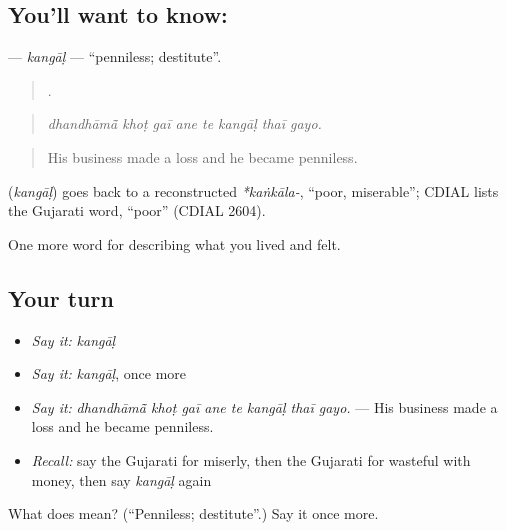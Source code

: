 \subsection*{You'll want to know: }
\textbf{} — \emph{kangāḷ} — \textquotedblleft{}penniless; destitute\textquotedblright{}.

\begin{quote}
       .
\end{quote}

\begin{quote}
\emph{dhandhāmā̃ khoṭ gaī ane te kangāḷ thaī gayo.}
\end{quote}

\begin{quote}
His business made a loss and he became penniless.
\end{quote}

\begin{cousinweb}
\textbf{} (\emph{kangāḷ}) goes back to a reconstructed \emph{*kaṅkāla-}, \textquotedblleft{}poor, miserable\textquotedblright{}; CDIAL lists the Gujarati word, \textquotedblleft{}poor\textquotedblright{} (CDIAL 2604).
\end{cousinweb}

\begin{grammarlens}[title={What you've built}]
One more word for describing what you lived and felt.
\end{grammarlens}

\subsection*{Your turn}
\begin{itemize}
\raggedright
  \item \emph{Say it:} \emph{kangāḷ}
  \item \emph{Say it:} \emph{kangāḷ}, once more
  \item \emph{Say it:} \emph{dhandhāmā̃ khoṭ gaī ane te kangāḷ thaī gayo.} — His business made a loss and he became penniless.
  \item \emph{Recall:} say the Gujarati for miserly, then the Gujarati for wasteful with money, then say \emph{kangāḷ} again
\end{itemize}

\begin{tcolorbox}[breakable,colback=teal!4,colframe=teal!35!black,title={Before you move on}]
What does  mean? (\textquotedblleft{}Penniless; destitute\textquotedblright{}.) Say it once more.
\end{tcolorbox}
